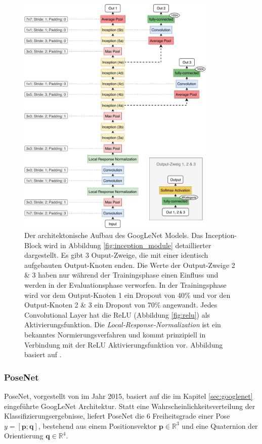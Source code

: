 \vspace*{\fill}
	 \begin{figure}[H]
		\centering
		\includegraphics[width=0.85\textwidth]{images/googlenet/googlenet_diagram.pdf}
		\caption{Der architektonische Aufbau des GoogLeNet Models. Das Inception-Block wird in Abbildung \ref{fig:inception_module} detaillierter dargestellt. Es gibt 3 Ouput-Zweige, die mit einer identisch aufgebauten Output-Knoten enden. Die Werte der Output-Zweige 2 \& 3 haben nur während der Trainingsphase einen Einfluss und werden in der Evaluationsphase verworfen. In der Trainingsphase wird vor dem Output-Knoten 1 ein Dropout von 40\% und vor den Output-Knoten 2 \& 3 ein Dropout von 70\% angewandt. Jedes Convolutional Layer hat die ReLU (Abbildung \ref{fig:relu}) als Aktivierungsfunktion. Die \textit{Local-Response-Normalization} \cite{krizhevskyImageNetClassificationDeep2012a} ist ein bekanntes Normierungsverfahren und kommt prinzipiell in Verbindung mit der ReLU Aktivierungsfunktion vor. Abbildung basiert auf \cite{szegedyGoingDeeperConvolutions2015}.}
		\label{fig:googlenet}
	\end{figure}
\subsubsection{PoseNet}
\label{sec:posenet}
PoseNet, vorgestellt von \citet{kendallPoseNetConvolutionalNetwork2015} im Jahr 2015, basiert auf die im Kapitel \ref{sec:googlenet} eingeführte GoogLeNet Architektur. Statt eine Wahrscheinlichkeitsverteilung der Klassifizierungsergebnisse, liefert PoseNet die 6 Freiheitsgrade einer Pose $y = [\pmb{p};\pmb{q}]$, bestehend aus einem Positionsvektor $\pmb{p} \in  \mathbb{R}^{3}$ und eine Quaternion der Orientierung $ \pmb{q} \in  \mathbb{R}^{4}$.

